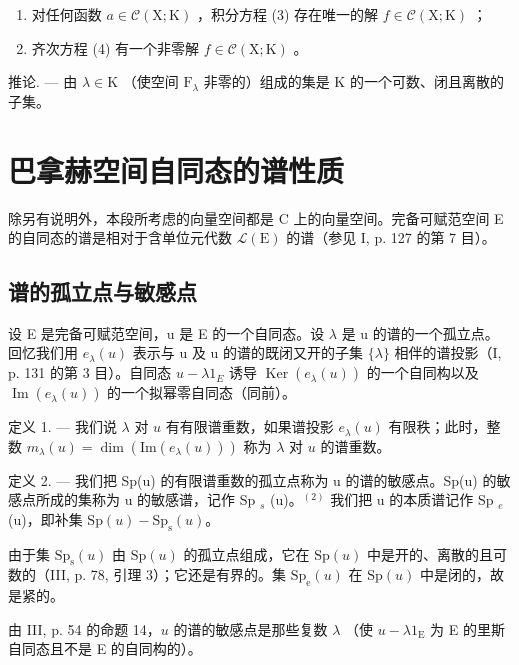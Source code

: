 \begin{enumerate}
\def\labelenumi{(\roman{enumi})}
\item
  对任何函数 \(a \in \mathcal{C}(\mathrm{X};\mathrm{K})\) ，积分方程 (3) 存在唯一的解 \(f \in \mathcal{C}(\mathrm{X};\mathrm{K})\) ；
\item
  齐次方程 (4) 有一个非零解 \(f \in \mathcal{C}(\mathrm{X};\mathrm{K})\) 。
\end{enumerate}

推论. --- 由 \(\lambda\in\mathrm{K}\) （使空间 \(\mathrm{F}_{\lambda}\) 非零的）组成的集是 K 的一个可数、闭且离散的子集。

\section{巴拿赫空间自同态的谱性质}

除另有说明外，本段所考虑的向量空间都是 C 上的向量空间。完备可赋范空间 E 的自同态的谱是相对于含单位元代数 \(\mathcal{L}(\mathrm{E})\) 的谱（参见 I, p. 127 的第 7 目）。

\subsection{谱的孤立点与敏感点}

设 E 是完备可赋范空间，u 是 E 的一个自同态。设 \(\lambda\) 是 u 的谱的一个孤立点。回忆我们用 \(e_{\lambda}(u)\) 表示与 u 及 u 的谱的既闭又开的子集 \(\{\lambda\}\) 相伴的谱投影（I, p. 131 的第 3 目）。自同态 \(u - \lambda1_{E}\) 诱导 \(\operatorname{Ker}(e_{\lambda}(u))\) 的一个自同构以及 \(\operatorname{Im}(e_{\lambda}(u))\) 的一个拟幂零自同态（同前）。

定义 1. --- 我们说 \(\lambda\) 对 \(u\) 有有限谱重数，如果谱投影 \(e_{\lambda}(u)\) 有限秩；此时，整数 \(m_{\lambda}(u) = \dim (\mathrm{Im}(e_{\lambda}(u)))\) 称为 \(\lambda\) 对 \(u\) 的谱重数。

定义 2. --- 我们把 Sp(u) 的有限谱重数的孤立点称为 u 的谱的敏感点。Sp(u) 的敏感点所成的集称为 u 的敏感谱，记作 Sp \(_{s}\) (u)。\(^{(2)}\) 我们把 u 的本质谱记作 Sp \(_{e}\) (u)，即补集 \(\mathrm{Sp}(u) - \mathrm{Sp}_{\mathrm{s}}(u)\)。

由于集 \(\mathrm{Sp}_{\mathrm{s}}(u)\) 由 \(\mathrm{Sp}(u)\) 的孤立点组成，它在 \(\mathrm{Sp}(u)\) 中是开的、离散的且可数的（III, p. 78, 引理 3）；它还是有界的。集 \(\mathrm{Sp}_{\mathrm{e}}(u)\) 在 \(\mathrm{Sp}(u)\) 中是闭的，故是紧的。

由 III, p. 54 的命题 14，\(u\) 的谱的敏感点是那些复数 \(\lambda\) （使 \(u - \lambda 1_{\mathrm{E}}\) 为 E 的里斯自同态且不是 E 的自同构的）。

